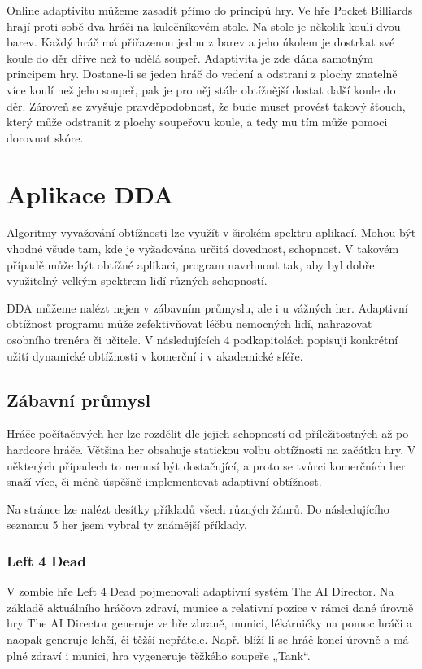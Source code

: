 Online adaptivitu můžeme zasadit přímo do principů hry. Ve hře Pocket Billiards hrají proti sobě dva hráči na kulečníkovém stole. Na stole je několik koulí dvou barev. Každý hráč má přiřazenou jednu z barev a jeho úkolem je dostrkat své koule do děr dříve než to udělá soupeř. Adaptivita je zde dána samotným principem hry. Dostane-li se jeden hráč do vedení a odstraní z plochy znatelně více koulí než jeho soupeř, pak je pro něj stále obtížnější dostat další koule do děr. Zároveň se zvyšuje pravděpodobnost, že bude muset provést takový šťouch, který může odstranit z plochy soupeřovu koule, a tedy mu tím může pomoci dorovnat skóre.\cite{5}

\section{Aplikace DDA} \label{sec:aplikacedda}

Algoritmy vyvažování obtížnosti lze využít v širokém spektru aplikací. Mohou být vhodné všude tam, kde je vyžadována určitá dovednost, schopnost. V takovém případě může být obtížné aplikaci, program navrhnout tak, aby byl dobře využitelný velkým spektrem lidí různých schopností.

DDA můžeme nalézt nejen v zábavním průmyslu, ale i u vážných her. Adaptivní obtížnost programu může zefektivňovat léčbu nemocných lidí, nahrazovat osobního trenéra či učitele. V následujících 4 podkapitolách popisuji konkrétní užití dynamické obtížnosti v komerční i v akademické sféře.

\subsection{Zábavní průmysl}

Hráče počítačových her lze rozdělit dle jejich schopností od příležitostných až po hardcore hráče. Většina her obsahuje statickou volbu obtížnosti na začátku hry. V některých případech to nemusí být dostačující, a proto se tvůrci komerčních her snaží více, či méně úspěšně implementovat adaptivní obtížnost.

Na stránce \cite{1} lze nalézt desítky příkladů všech různých žánrů. Do následujícího seznamu 5 her jsem vybral ty známější příklady.


\subsubsection{Left 4 Dead}
\label{sec:Left4Dead}

V zombie hře Left 4 Dead pojmenovali adaptivní systém The AI Director. Na základě aktuálního hráčova zdraví, munice a relativní pozice v rámci dané úrovně hry The AI Director generuje ve hře zbraně, munici, lékárničky na pomoc hráči a naopak generuje lehčí, či těžší nepřátele. Např. blíží-li se hráč konci úrovně a má plné zdraví i munici, hra vygeneruje těžkého soupeře „Tank“. \cite{2}

